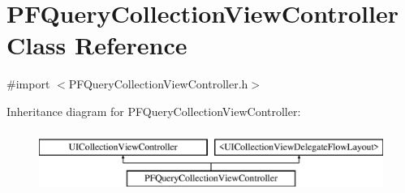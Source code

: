 \hypertarget{interface_p_f_query_collection_view_controller}{}\section{P\+F\+Query\+Collection\+View\+Controller Class Reference}
\label{interface_p_f_query_collection_view_controller}


{\ttfamily \#import $<$P\+F\+Query\+Collection\+View\+Controller.\+h$>$}

Inheritance diagram for P\+F\+Query\+Collection\+View\+Controller\+:\begin{figure}[H]
\begin{center}
\leavevmode
\includegraphics[height=2.000000cm]{interface_p_f_query_collection_view_controller}
\end{center}
\end{figure}

